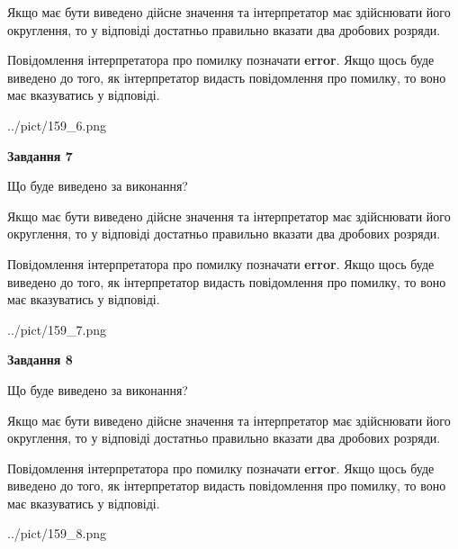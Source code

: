 \documentclass[12pt, ukrainian]{article}
\begin{document}
{\begin {Large}
Якщо має бути виведено дійсне значення та інтерпретатор має здійснювати його округлення, 
то у відповіді достатньо правильно вказати два дробових розряди.

Повідомлення інтерпретатора про помилку позначати \textbf{error}.
Якщо щось буде виведено до того, як інтерпретатор видасть повідомлення про помилку, 
то воно має вказуватись у відповіді. \par

\begin{center}
	{../pict/159_6.png}
\end{center}
\newpage

{\begin {center}\textbf{Завдання 7}\end {center}}\par
Що буде виведено за виконання? \par

Якщо має бути виведено дійсне значення та інтерпретатор має здійснювати його округлення, 
то у відповіді достатньо правильно вказати два дробових розряди.

Повідомлення інтерпретатора про помилку позначати \textbf{error}.
Якщо щось буде виведено до того, як інтерпретатор видасть повідомлення про помилку, 
то воно має вказуватись у відповіді. \par

\begin{center}
	{../pict/159_7.png}
\end{center}
\newpage

{\begin {center}\textbf{Завдання 8}\end {center}}\par
Що буде виведено за виконання? \par

Якщо має бути виведено дійсне значення та інтерпретатор має здійснювати його округлення, 
то у відповіді достатньо правильно вказати два дробових розряди.

Повідомлення інтерпретатора про помилку позначати \textbf{error}.
Якщо щось буде виведено до того, як інтерпретатор видасть повідомлення про помилку, 
то воно має вказуватись у відповіді. \par

\begin{center}
	{../pict/159_8.png}
\end{center}
\newpage


\end{Large}}
\end{document}
